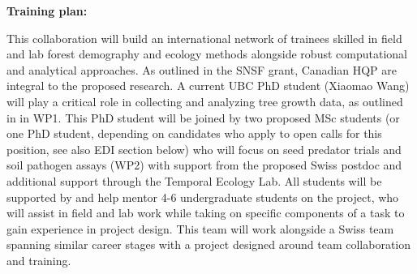 \documentclass[11pt]{article}
\begin{document}
{\bf Training plan:}  %

This collaboration will build an international network of trainees skilled in field and lab forest demography and ecology methods alongside robust computational and analytical approaches. As outlined in the SNSF grant, Canadian HQP are integral to the proposed research. A current UBC PhD student (Xiaomao Wang) will play a critical role in collecting and analyzing tree growth data, as outlined in in WP1. This PhD student will be joined by two proposed MSc students (or one PhD student, depending on candidates who apply to open calls for this position, see also EDI section below) who will focus on seed predator trials and soil pathogen assays (WP2) with support from the proposed Swiss postdoc and additional support through the Temporal Ecology Lab. All students will be supported by and help mentor 4-6 undergraduate students on the project, who will assist in field and lab work while taking on specific components of a task to gain experience in project design. This team will work alongside a Swiss team spanning similar career stages with a project designed around team collaboration and training.
\end{document}
